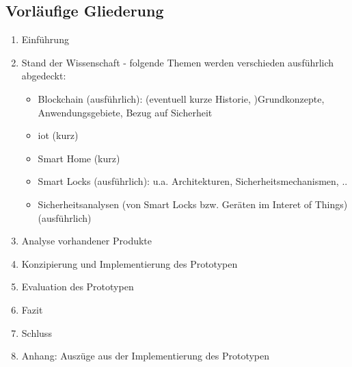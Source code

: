     \subsection*{Vorläufige Gliederung}
        \begin{enumerate}
            \item Einführung
            \item Stand der Wissenschaft - folgende Themen werden verschieden ausführlich abgedeckt:
                \begin{itemize}
                    \item Blockchain (ausführlich): (eventuell kurze Historie, )Grundkonzepte, Anwendungsgebiete, Bezug auf Sicherheit
                    \item \gls{iot} (kurz)
                    \item Smart Home (kurz)
                    \item Smart Locks (ausführlich): u.a. Architekturen, Sicherheitsmechanismen, ..
                    \item Sicherheitsanalysen (von Smart Locks bzw. Geräten im Interet of Things) (ausführlich)
                \end{itemize}
            \item Analyse vorhandener Produkte
            \item Konzipierung und Implementierung des Prototypen
            \item Evaluation des Prototypen
            \item Fazit
            \item Schluss
            \item Anhang: Auszüge aus der Implementierung des Prototypen
        \end{enumerate}